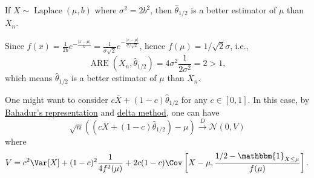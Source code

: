 \begin{eg}\label{eg:ARE-Laplace}
	If \(X \sim \operatorname{Laplace}(\mu , b) \) where \(\sigma ^2 = 2b^2\), then \(\hat{\theta} _{1 / 2}\) is a better estimator of \(\mu \) than \(\overline{X} _n\).
\end{eg}
\begin{explanation}
	Since \(f(x) = \frac{1}{2b} e^{- \frac{\vert x - \mu \vert }{b}} = \frac{1}{\sigma \sqrt{2} } e^{- \frac{\vert x - \mu \vert }{\sigma / \sqrt{2}}}\), hence \(f(\mu ) = 1 /\sqrt{2} \sigma \), i.e.,
	\[
		\operatorname{ARE}(\overline{X} _n, \hat{\theta} _{1 / 2})
		= 4 \sigma ^2 \frac{1}{2 \sigma ^2}
		= 2 > 1,
	\]
	which means \(\hat{\theta} _{1 / 2}\) is a better estimator of \(\mu \) than \(\overline{X} _n\).
\end{explanation}

One might want to consider \(c \overline{X} + (1 - c)\hat{\theta} _{1 / 2}\) for any \(c \in [0, 1]\). In this case, by \hyperref[thm:Bahadur-representation]{Bahadur's representation} and \hyperref[thm:delta-method]{delta method}, one can have
\[
	\sqrt{n} \left( (c \overline{X} + (1 - c)\hat{\theta} _{1 / 2}) - \mu \right) \overset{D}{\to} \mathcal{N} (0, V)
\]
where
\[
	V = c^2 \Var_{}[X] + (1 - c)^2 \frac{1}{4 f^2(\mu )} + 2c(1 - c) \Cov_{}\left[X - \mu , \frac{1 / 2 - \mathbbm{1}_{X \leq \mu } }{f(\mu )}\right].
\]